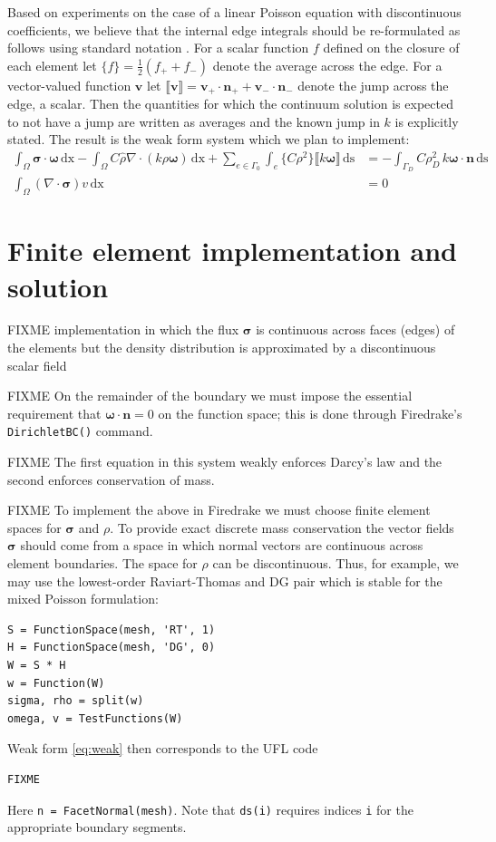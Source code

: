 \documentclass[11pt]{amsart}
\newcommand{\bn}{\mathbf{n}}
\newcommand{\bv}{\mathbf{v}}
\newcommand{\bsigma}{\bm{\sigma}}
\newcommand{\bomega}{\bm{\omega}}
\newcommand{\dx}{\mathrm{dx}}
\newcommand{\ds}{\mathrm{ds}}
\newcommand{\Div}{\nabla\cdot}
\newcommand{\jump}[1]{\llbracket #1 \rrbracket }
\begin{document}
Based on experiments on the case of a linear Poisson equation with discontinuous coefficients, we believe that the internal edge integrals should be re-formulated as follows using standard notation \citep{Arnold2002}.  For a scalar function $f$ defined on the closure of each element let $\{f\} = \frac{1}{2} (f_+ + f_-)$ denote the average across the edge.  For a vector-valued function $\bv$ let $\jump{\bv} = \bv_+ \cdot \bn_+ + \bv_- \cdot \bn_-$ denote the jump across the edge, a scalar.  Then the quantities for which the continuum solution is expected to not have a jump are written as averages and the known jump in $k$ is explicitly stated.  The result is the weak form system which we plan to implement: 
\begin{subequations}
\label{eq:weak}
\begin{align}
\int_\Omega \bsigma\cdot \bomega\,\dx - \int_\Omega C \hat\rho \Div(k\rho\bomega)\,\dx + \sum_{e\in\Gamma_0} \int_e \{C \rho^2\} \jump{k \bomega}\,\ds &= -\int_{\Gamma_D} C \rho_D^2 \, k \bomega\cdot\bn\,\ds \label{eq:weak:darcy} \\
\int_\Omega (\Div \bsigma) v\,\dx &= 0 \label{eq:weak:masscont}
\end{align}
\end{subequations}


\section{Finite element implementation and solution}

FIXME implementation in which the flux $\bsigma$ is continuous across faces (edges) of the elements but the density distribution is approximated by a discontinuous scalar field

FIXME  On the remainder of the boundary we must impose the essential requirement that $\bomega\cdot \bn=0$ on the function space; this is done through Firedrake's \verb|DirichletBC()| command.

FIXME The first equation in this system weakly enforces Darcy's law and the second enforces conservation of mass.

FIXME To implement the above in Firedrake we must choose finite element spaces for $\bsigma$ and $\rho$.  To provide exact discrete mass conservation the vector fields $\bsigma$ should come from a space in which normal vectors are continuous across element boundaries.  The space for $\rho$ can be discontinuous.  Thus, for example, we may use the lowest-order Raviart-Thomas and DG pair which is stable for the mixed Poisson formulation:
\begin{Verbatim}[fontsize=\small,frame=lines]
S = FunctionSpace(mesh, 'RT', 1)
H = FunctionSpace(mesh, 'DG', 0)
W = S * H
w = Function(W)
sigma, rho = split(w)
omega, v = TestFunctions(W)
\end{Verbatim}
Weak form \eqref{eq:weak} then corresponds to the UFL code
\begin{Verbatim}[fontsize=\small,frame=lines]
FIXME
\end{Verbatim}
Here \verb|n = FacetNormal(mesh)|.  Note that \verb|ds(i)| requires indices \verb|i| for the appropriate boundary segments.
\end{document}
